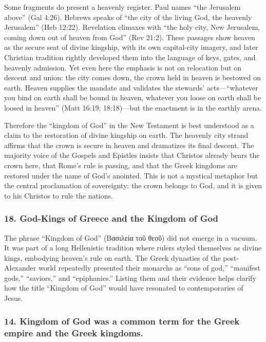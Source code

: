 Some fragments do present a heavenly register.
Paul names “the Jerusalem above” (Gal 4:26).
Hebrews speaks of “the city of the living God, the heavenly Jerusalem” (Heb 12:22).
Revelation climaxes with “the holy city, New Jerusalem, coming down out of heaven from God” (Rev 21:2).
These passages show heaven as the secure seat of divine kingship, with its own capital-city imagery, and later Christian tradition rightly developed them into the language of keys, gates, and heavenly admission.
Yet even here the emphasis is not on relocation but on descent and union: the city comes down, the crown held in heaven is bestowed on earth.
Heaven supplies the mandate and validates the stewards’ acts—“whatever you bind on earth shall be bound in heaven, whatever you loose on earth shall be loosed in heaven” (Matt 16:19; 18:18)—but the enactment is in the earthly arena.

Therefore the “kingdom of God” in the New Testament is best understood as a claim to the restoration of divine kingship on earth.
The heavenly city strand affirms that the crown is secure in heaven and dramatizes its final descent.
The majority voice of the Gospels and Epistles insists that Christos already bears the crown here, that Rome’s rule is passing, and that the Greek kingdoms are restored under the name of God’s anointed.
This is not a mystical metaphor but the central proclamation of sovereignty: the crown belongs to God, and it is given to his Christos to rule the nations.

\subsubsection{18. God-Kings of Greece and the Kingdom of God}\label{subsubsec:god-kings-of-greece-and-the-kingdom-of-god}
The phrase “Kingdom of God” (\textgreek{Βασιλεία τοῦ θεοῦ}) did not emerge in a vacuum.
It was part of a long Hellenistic tradition where rulers styled themselves as divine kings, embodying heaven’s rule on earth.
The Greek dynasties of the post-Alexander world repeatedly presented their monarchs as “sons of god,” “manifest gods,” “saviors,” and “epiphanies.”
Listing them and their evidence helps clarify how the title “Kingdom of God” would have resonated to contemporaries of Jesus.

\subsubsection{14.
Kingdom of God was a common term for the Greek empire and the Greek kingdoms.}\label{subsubsec:kingdom-of-god-was-a-common-term-for-the-greek-empire-and-the-greek-kingdoms.}

